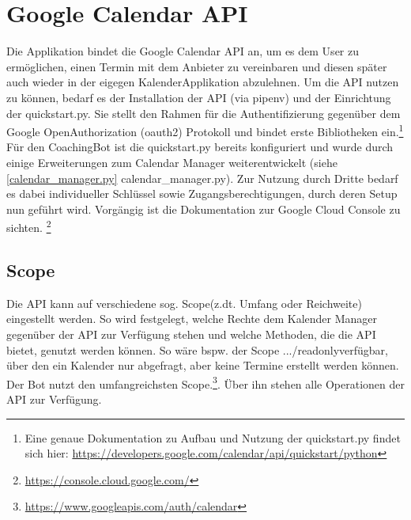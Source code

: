     \section{Google Calendar API} \label{Google Calendar API}
        Die Applikation bindet die Google Calendar API \cite{googleCalAPI} an, um es dem User zu ermöglichen, einen Termin mit dem Anbieter zu vereinbaren und diesen später auch wieder in der eigegen Kalender\-Applikation abzulehnen.
        Um die API nutzen zu können, bedarf es der Installation der API (via pipenv) und der Einrichtung der quickstart.py. Sie stellt den Rahmen für die Authentifizierung gegenüber dem Google Open\-Authorization (oauth2) Protokoll und bindet erste Bibliotheken ein.\footnote{Eine genaue Dokumentation zu Aufbau und Nutzung der quickstart.py findet sich hier: \url{https://developers.google.com/calendar/api/quickstart/python}}
        Für den CoachingBot ist die quickstart.py bereits konfiguriert und wurde durch einige Erweiterungen zum Calendar Manager weiterentwickelt (siehe \ref{calendar_manager.py} calendar\_manager.py). Zur Nutzung durch Dritte bedarf es dabei individueller Schlüssel sowie Zugangsberechtigungen, durch deren Setup nun geführt wird. Vorgängig ist die Dokumentation zur Google Cloud Console zu sichten. 
        \footnote{\url{https://console.cloud.google.com/}}
        
            \subsection{Scope}
                Die API kann auf verschiedene sog. \glq Scope\grq (z.dt. Umfang oder Reichweite) eingestellt werden. So wird festgelegt, welche Rechte dem Kalender Manager gegenüber der API zur Verfügung stehen und welche Methoden, die die API bietet, genutzt werden können. So wäre bspw. der Scope \glqq.../readonly\grqq verfügbar, über den ein Kalender nur abgefragt, aber keine Termine erstellt werden können.\\
                Der Bot nutzt den umfangreichsten Scope.\footnote{\url{https://www.googleapis.com/auth/calendar}}. Über ihn stehen alle Operationen der API zur Verfügung.

